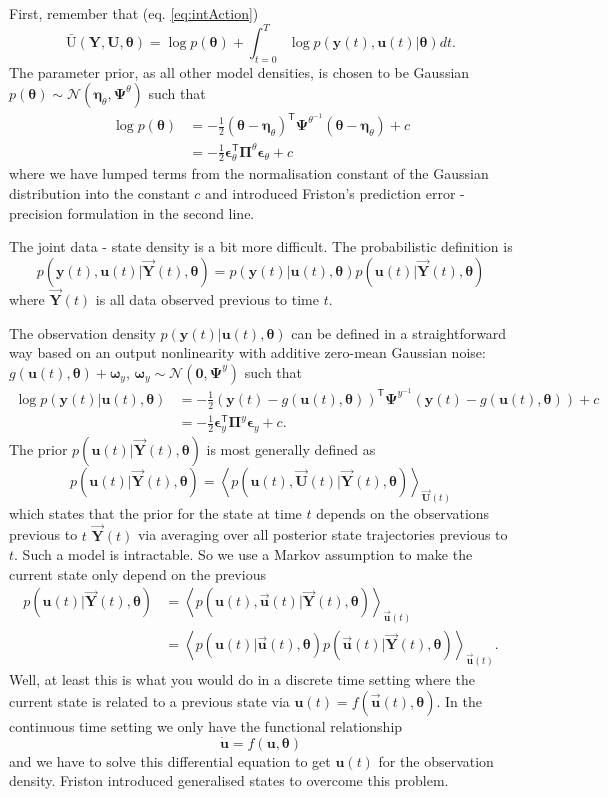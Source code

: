 \documentclass[a4paper,10pt]{article}
\newcommand{\bs}[1]{\mathbf{#1}}					%
\newcommand{\bgs}[1]{\boldsymbol{#1}}				%
\newcommand{\tr}{\mathsf{T}}				%
\newcommand{\eq}[1]{\begin{equation} #1 \end{equation}}%
\renewcommand{\ss}{u}         %
\newcommand{\so}{y}         %
\newcommand{\spe}{\epsilon} %
\renewcommand{\sp}{\theta}    %
\newcommand{\ps}{\bs{\ss}}    %
\newcommand{\po}{\bs{\so}}    %
\newcommand{\ppe}{\bgs{\spe}} %
\newcommand{\pp}{\bgs{\sp}} %
\newcommand{\Ps}{\bs{U}}    %
\newcommand{\Po}{\bs{Y}}    %
\newcommand{\E}[2][]{\left\langle #2 \right\rangle_{#1}}	%
\newcommand{\Ua}{\bar{\mathrm{U}}}		%
\newcommand{\N}{\mathcal{N}}			%
\begin{document}
First, remember that (eq. \ref{eq:intAction})
\[
    \Ua(\Po,\Ps,\pp) = \log p(\pp) + \int_{t=0}^T \log p(\po(t),\ps(t)|\pp)dt.
\]
The parameter prior, as all other model densities, is chosen to be Gaussian $p(\pp)\sim \N(\bgs{\eta}_\sp,\bgs{\Psi}^\sp)$ such that 
\begin{align}
    \log p(\pp) &= -\frac{1}{2}(\pp - \bgs{\eta}_\sp)^\tr\bgs{\Psi}^{\sp^{-1}}(\pp - \bgs{\eta}_\sp) + c\\
    &= -\frac{1}{2}\ppe_\sp^\tr\bgs{\Pi}^{\sp}\ppe_\sp + c
\end{align}
where we have lumped terms from the normalisation constant of the Gaussian distribution into the constant $c$ and introduced Friston's prediction error - precision formulation in the second line.

The joint data - state density is a bit more difficult. The probabilistic definition is
\eq{
    p(\po(t),\ps(t)|\vec{\Po}(t),\pp) = p(\po(t)|\ps(t),\pp)p(\ps(t)|\vec{\Po}(t),\pp)
}
where $\vec{\Po}(t)$ is all data observed previous to time $t$.

The observation density $p(\po(t)|\ps(t),\pp)$ can be defined in a straightforward way based on an output nonlinearity with additive zero-mean Gaussian noise: $g(\ps(t),\pp)+\bgs{\omega}_\so$, $\bgs{\omega}_\so\sim \N(\bs{0},\bgs{\Psi}^\so)$ such that
\begin{align}
    \log p(\po(t)|\ps(t),\pp) &= -\frac{1}{2}(\po(t) - g(\ps(t),\pp))^\tr\bgs{\Psi}^{\so^{-1}}(\po(t) - g(\ps(t),\pp)) + c\\
    &= -\frac{1}{2}\ppe_\so^\tr\bgs{\Pi}^{\so}\ppe_\so + c.
\end{align}
The prior $p(\ps(t)|\vec{\Po}(t),\pp)$ is most generally defined as
\eq{
    p(\ps(t)|\vec{\Po}(t),\pp) = \E[\vec{\Ps}(t)]{p(\ps(t),\vec{\Ps}(t)|\vec{\Po}(t),\pp)}
}
which states that the prior for the state at time $t$ depends on the observations previous to $t$ $\vec{\Po}(t)$ via averaging over all posterior state trajectories previous to $t$. Such a model is intractable. So we use a Markov assumption to make the current state only depend on the previous
\begin{align}
    p(\ps(t)|\vec{\Po}(t),\pp) &= \E[\vec{\ps}(t)]{p(\ps(t),\vec{\ps}(t)|\vec{\Po}(t),\pp)}\\
    &= \label{eq:statePrior} \E[\vec{\ps}(t)]{p(\ps(t)|\vec{\ps}(t),\pp)p(\vec{\ps}(t)|\vec{\Po}(t),\pp)}.
\end{align}
Well, at least this is what you would do in a discrete time setting where the current state is related to a previous state via $\ps(t) = f(\vec{\ps}(t),\pp)$. In the continuous time setting we only have the functional relationship
\eq{
    \dot{\ps} = f(\ps,\pp)
}
and we have to solve this differential equation to get $\ps(t)$ for the observation density. Friston introduced generalised states to overcome this problem. 
\end{document}
